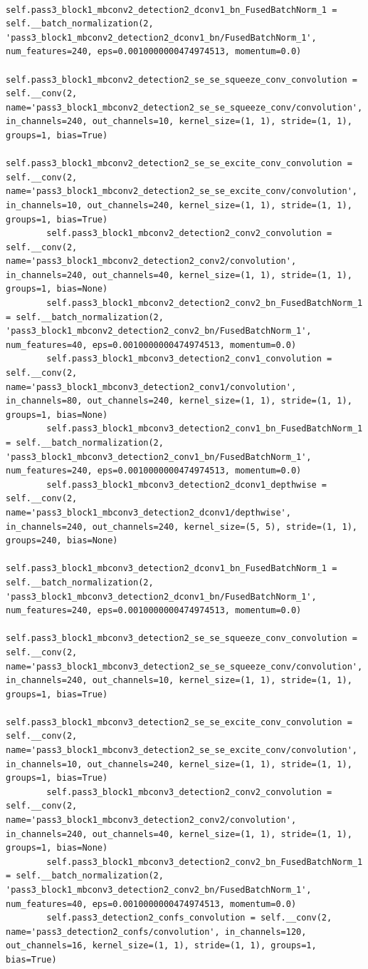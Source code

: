 \documentclass{fisatprojectfinal}
\begin{document}
\begin{appendices}
\begin{lstlisting}
        self.pass3_block1_mbconv2_detection2_dconv1_bn_FusedBatchNorm_1 = self.__batch_normalization(2, 'pass3_block1_mbconv2_detection2_dconv1_bn/FusedBatchNorm_1', num_features=240, eps=0.0010000000474974513, momentum=0.0)
        self.pass3_block1_mbconv2_detection2_se_se_squeeze_conv_convolution = self.__conv(2, name='pass3_block1_mbconv2_detection2_se_se_squeeze_conv/convolution', in_channels=240, out_channels=10, kernel_size=(1, 1), stride=(1, 1), groups=1, bias=True)
        self.pass3_block1_mbconv2_detection2_se_se_excite_conv_convolution = self.__conv(2, name='pass3_block1_mbconv2_detection2_se_se_excite_conv/convolution', in_channels=10, out_channels=240, kernel_size=(1, 1), stride=(1, 1), groups=1, bias=True)
        self.pass3_block1_mbconv2_detection2_conv2_convolution = self.__conv(2, name='pass3_block1_mbconv2_detection2_conv2/convolution', in_channels=240, out_channels=40, kernel_size=(1, 1), stride=(1, 1), groups=1, bias=None)
        self.pass3_block1_mbconv2_detection2_conv2_bn_FusedBatchNorm_1 = self.__batch_normalization(2, 'pass3_block1_mbconv2_detection2_conv2_bn/FusedBatchNorm_1', num_features=40, eps=0.0010000000474974513, momentum=0.0)
        self.pass3_block1_mbconv3_detection2_conv1_convolution = self.__conv(2, name='pass3_block1_mbconv3_detection2_conv1/convolution', in_channels=80, out_channels=240, kernel_size=(1, 1), stride=(1, 1), groups=1, bias=None)
        self.pass3_block1_mbconv3_detection2_conv1_bn_FusedBatchNorm_1 = self.__batch_normalization(2, 'pass3_block1_mbconv3_detection2_conv1_bn/FusedBatchNorm_1', num_features=240, eps=0.0010000000474974513, momentum=0.0)
        self.pass3_block1_mbconv3_detection2_dconv1_depthwise = self.__conv(2, name='pass3_block1_mbconv3_detection2_dconv1/depthwise', in_channels=240, out_channels=240, kernel_size=(5, 5), stride=(1, 1), groups=240, bias=None)
        self.pass3_block1_mbconv3_detection2_dconv1_bn_FusedBatchNorm_1 = self.__batch_normalization(2, 'pass3_block1_mbconv3_detection2_dconv1_bn/FusedBatchNorm_1', num_features=240, eps=0.0010000000474974513, momentum=0.0)
        self.pass3_block1_mbconv3_detection2_se_se_squeeze_conv_convolution = self.__conv(2, name='pass3_block1_mbconv3_detection2_se_se_squeeze_conv/convolution', in_channels=240, out_channels=10, kernel_size=(1, 1), stride=(1, 1), groups=1, bias=True)
        self.pass3_block1_mbconv3_detection2_se_se_excite_conv_convolution = self.__conv(2, name='pass3_block1_mbconv3_detection2_se_se_excite_conv/convolution', in_channels=10, out_channels=240, kernel_size=(1, 1), stride=(1, 1), groups=1, bias=True)
        self.pass3_block1_mbconv3_detection2_conv2_convolution = self.__conv(2, name='pass3_block1_mbconv3_detection2_conv2/convolution', in_channels=240, out_channels=40, kernel_size=(1, 1), stride=(1, 1), groups=1, bias=None)
        self.pass3_block1_mbconv3_detection2_conv2_bn_FusedBatchNorm_1 = self.__batch_normalization(2, 'pass3_block1_mbconv3_detection2_conv2_bn/FusedBatchNorm_1', num_features=40, eps=0.0010000000474974513, momentum=0.0)
        self.pass3_detection2_confs_convolution = self.__conv(2, name='pass3_detection2_confs/convolution', in_channels=120, out_channels=16, kernel_size=(1, 1), stride=(1, 1), groups=1, bias=True)


\end{lstlisting}
\end{appendices}
\end{document}
